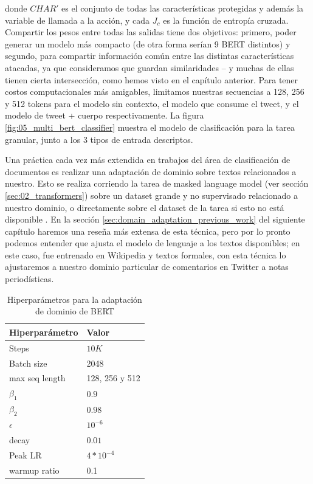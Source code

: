 donde $CHAR'$ es el conjunto de todas las características protegidas y además la variable de llamada a la acción, y cada $ J_c $ es la función de entropía cruzada. Compartir los pesos entre todas las salidas tiene dos objetivos: primero, poder generar un modelo más compacto (de otra forma serían 9 BERT distintos) y segundo, para compartir información común entre las distintas características atacadas, ya que consideramos que guardan similaridades -- y muchas de ellas tienen cierta intersección, como hemos visto en el capítulo anterior. Para tener costos computacionales más amigables, limitamos nuestras secuencias a 128, 256 y 512 tokens para el modelo sin contexto, el modelo que consume el tweet, y el modelo de tweet + cuerpo respectivamente. La figura \ref{fig:05_multi_bert_classifier} muestra el modelo de clasificación para la tarea granular, junto a los 3 tipos de entrada descriptos.

Una práctica cada vez más extendida en trabajos del área de clasificación de documentos es realizar una adaptación de dominio sobre textos relacionados a nuestro. Esto se realiza corriendo la tarea de masked language model (ver sección \ref{sec:02_transformers}) sobre un dataset grande y no supervisado relacionado a nuestro dominio, o directamente sobre el dataset de la tarea si esto no está disponible \cite{gururangan-etal-2020-dont}. En la sección \ref{sec:domain_adaptation_previous_work} del siguiente capítulo haremos una reseña más extensa de esta técnica, pero por lo pronto podemos entender que ajusta el modelo de lenguaje a los textos disponibles; en este caso, \beto{} fue entrenado en Wikipedia y textos formales, con esta técnica lo ajustaremos a nuestro dominio particular de comentarios en Twitter a notas periodísticas.

\begin{table}[t]
    \centering
    \begin{tabular}{ll}
        \toprule
        Hiperparámetro & Valor         \\
        \midrule
        Steps          & $10K$           \\
        Batch size     & 2048            \\
        max seq length & 128, 256 y 512  \\
        $\beta_1$      & $0.9$           \\
        $\beta_2$      & $0.98$          \\
        $\epsilon$     & $10^{-6}$       \\
        decay          & $0.01$          \\
        Peak LR        & $4*10^{-4}$     \\
        warmup ratio   & 0.1             \\
        \bottomrule
    \end{tabular}
    \caption{Hiperparámetros para la adaptación de dominio de BERT}
    \label{tab:hs_ft_hyperparameter}
\end{table}

